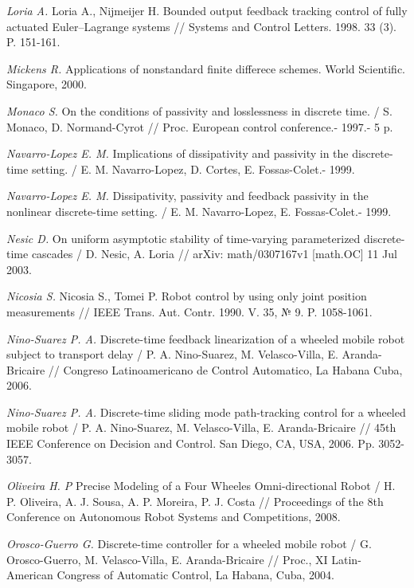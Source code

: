 \begin{thebibliography}{10}
	{\it Loria A.} Loria A., Nijmeijer H. Bounded output feedback tracking control of fully actuated Euler–Lagrange systems // Systems and Control Letters. 1998. 33 (3). P. 151-161.
	
	{\it Mickens R.} Applications of nonstandard finite differece schemes. World Scientific. Singapore, 2000.
	
	{\it Monaco S.} On the conditions of passivity and losslessness in discrete time. / S. Monaco, D. Normand-Cyrot // Proc. European control conference.- 1997.- 5 p.
	
	{\it Navarro-Lopez E. M.} Implications of dissipativity and passivity in the discrete-time setting. / E. M. Navarro-Lopez, D. Cortes, E. Fossas-Colet.- 1999.
	
	{\it Navarro-Lopez E. M.} Dissipativity, passivity and feedback passivity in the nonlinear discrete-time setting. / E. M. Navarro-Lopez, E. Fossas-Colet.- 1999.
	
	{\it Nesic D.} On uniform asymptotic stability of time-varying parameterized discrete-time cascades / D. Nesic, A. Loria // arXiv: math/0307167v1 [math.OC] 11 Jul 2003.
	
	{\it Nicosia S.} Nicosia S., Tomei P. Robot control by using only joint position measurements // IEEE Trans. Aut. Contr. 1990. V. 35, № 9. P. 1058-1061.
	
	{\it Nino-Suarez P. A.} Discrete-time feedback linearization of a wheeled mobile robot subject to transport delay / P. A.  Nino-Suarez, M. Velasco-Villa, E. Aranda-Bricaire // Congreso Latinoamericano de Control Automatico, La Habana Cuba, 2006.
	
	{\it Nino-Suarez P. A.} Discrete-time sliding mode path-tracking control for a wheeled mobile robot / P. A.  Nino-Suarez, M. Velasco-Villa, E. Aranda-Bricaire // 45th IEEE Conference on Decision and Control. San Diego, CA, USA, 2006. Pp. 3052-3057.
	
	{\it Oliveira H. P} Precise Modeling of a Four Wheeles Omni-directional Robot / H. P. Oliveira, A. J. Sousa, A. P. Moreira, P. J. Costa // Proceedings of the 8th Conference on Autonomous Robot Systems and Competitions, 2008.
	
	{\it Orosco-Guerro G.} Discrete-time controller for a wheeled mobile robot / G. Orosco-Guerro, M. Velasco-Villa, E. Aranda-Bricaire // Proc., XI Latin-American Congress of Automatic Control, La Habana, Cuba, 2004.
	

\end{thebibliography}
